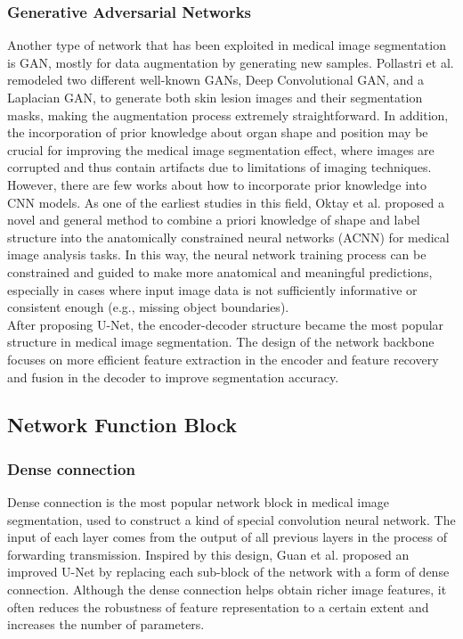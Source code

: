\subsubsection{Generative Adversarial Networks}
\label{subsubsec:gan}
Another type of network that has been exploited in medical image segmentation is GAN, mostly for data augmentation by generating new samples. Pollastri et al. remodeled two different well-known GANs, Deep Convolutional GAN, and a Laplacian GAN, to generate both skin lesion images and their segmentation masks, making the augmentation process extremely straightforward.
In addition, the incorporation of prior knowledge about
organ shape and position may be crucial for improving the medical
image segmentation effect, where images are corrupted and
thus contain artifacts due to limitations of imaging techniques.
However, there are few works about how to incorporate prior
knowledge into CNN models. As one of the earliest studies in this field, Oktay et al. proposed a novel and general
method to combine a priori knowledge of shape and label
structure into the anatomically constrained neural networks
(ACNN) for medical image analysis tasks. In this way, the neural network training process can be constrained and guided to
make more anatomical and meaningful predictions, especially
in cases where input image data is not sufficiently informative or consistent enough (e.g., missing object boundaries).\\

After proposing U-Net, the encoder-decoder structure
became the most popular structure in medical image segmentation. The design of the network backbone focuses on more
efficient feature extraction in the encoder and feature recovery
and fusion in the decoder to improve segmentation accuracy.

\subsection{Network Function Block}
\subsubsection{Dense connection}
Dense connection is the most popular network block in medical image
segmentation, used to construct a kind of special convolution neural network. The
input of each layer comes from the output of all previous layers in the process of forwarding transmission. Inspired by this design, Guan et al. proposed an
improved U-Net by replacing each sub-block of the network with a form of dense
connection. Although the dense connection helps obtain richer image
features, it often reduces the robustness of feature representation to a certain
extent and increases the number of parameters.

